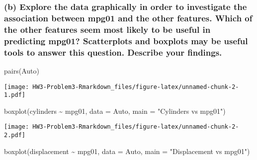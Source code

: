 \documentclass[
]{article}
\newenvironment{Shaded}{\begin{snugshade}}{\end{snugshade}}
\newcommand{\AttributeTok}[1]{\textcolor[rgb]{0.77,0.63,0.00}{#1}}
\newcommand{\FunctionTok}[1]{\textcolor[rgb]{0.00,0.00,0.00}{#1}}
\newcommand{\NormalTok}[1]{#1}
\newcommand{\SpecialCharTok}[1]{\textcolor[rgb]{0.00,0.00,0.00}{#1}}
\newcommand{\StringTok}[1]{\textcolor[rgb]{0.31,0.60,0.02}{#1}}
\begin{document}
\hypertarget{b-explore-the-data-graphically-in-order-to-investigate-the-association-between-mpg01-and-the-other-features.-which-of-the-other-features-seem-most-likely-to-be-useful-in-predicting-mpg01-scatterplots-and-boxplots-may-be-useful-tools-to-answer-this-question.-describe-your-findings.}{%
\subsubsection{(b) Explore the data graphically in order to investigate
the association between mpg01 and the other features. Which of the other
features seem most likely to be useful in predicting mpg01? Scatterplots
and boxplots may be useful tools to answer this question. Describe your
findings.}\label{b-explore-the-data-graphically-in-order-to-investigate-the-association-between-mpg01-and-the-other-features.-which-of-the-other-features-seem-most-likely-to-be-useful-in-predicting-mpg01-scatterplots-and-boxplots-may-be-useful-tools-to-answer-this-question.-describe-your-findings.}}

\begin{Shaded}
\begin{Highlighting}[]
\FunctionTok{pairs}\NormalTok{(Auto)}
\end{Highlighting}
\end{Shaded}

\texttt{[image: HW3-Problem3-Rmarkdown\_files/figure-latex/unnamed-chunk-2-1.pdf]}

\begin{Shaded}
\begin{Highlighting}[]
\FunctionTok{boxplot}\NormalTok{(cylinders }\SpecialCharTok{\textasciitilde{}}\NormalTok{ mpg01, }\AttributeTok{data =}\NormalTok{ Auto, }\AttributeTok{main =} \StringTok{"Cylinders vs mpg01"}\NormalTok{)}
\end{Highlighting}
\end{Shaded}

\texttt{[image: HW3-Problem3-Rmarkdown\_files/figure-latex/unnamed-chunk-2-2.pdf]}

\begin{Shaded}
\begin{Highlighting}[]
\FunctionTok{boxplot}\NormalTok{(displacement }\SpecialCharTok{\textasciitilde{}}\NormalTok{ mpg01, }\AttributeTok{data =}\NormalTok{ Auto, }\AttributeTok{main =} \StringTok{"Displacement vs mpg01"}\NormalTok{)}
\end{Highlighting}
\end{Shaded}
\end{document}
